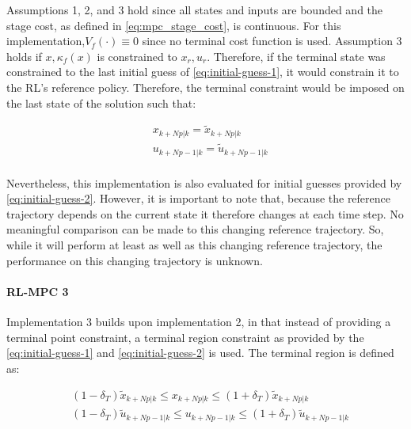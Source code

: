 Assumptions 1, 2, and 3 hold since all states and inputs are bounded and the stage cost, as defined in \autoref{eq:mpc_stage_cost}, is continuous. For this implementation,$V_f(\cdot) \equiv 0$ since no terminal cost function is used. Assumption 3 holds if $x,\kappa_f(x)$ is constrained to $x_r,u_r$. Therefore, if the terminal state was constrained to the last initial guess of \autoref{eq:initial-guess-1}, it would constrain it to the RL’s reference policy. Therefore, the terminal constraint would be imposed on the last state of the solution such that:

\begin{equation}\label{eq:terminal-constraint-ocp}
\begin{aligned}
	&x_{k+Np|k} = \tilde{x}_{k+Np|k}\\ 
	&u_{k+Np-1|k} = \tilde{u}_{k+Np-1|k}\\
\end{aligned}
\end{equation}

Nevertheless, this implementation is also evaluated for initial guesses provided by \autoref{eq:initial-guess-2}. However, it is important to note that, because the reference trajectory depends on the current state it therefore changes at each time step. No meaningful comparison can be made to this changing reference trajectory. So, while it will perform at least as well as this changing reference trajectory, the performance on this changing trajectory is unknown.

\paragraph{RL-MPC 3}
Implementation 3 builds upon implementation 2, in that instead of providing a terminal point constraint, a terminal region constraint as provided by the \autoref{eq:initial-guess-1} and \autoref{eq:initial-guess-2} is used. The terminal region is defined as:

\begin{equation}\label{eq:terminal-region}
	\begin{aligned}
		& (1-\delta_T)\tilde{x}_{k+Np|k} \leq x_{k+Np|k} \leq (1+\delta_T)\tilde{x}_{k+Np|k}\\
		&(1-\delta_T)\tilde{u}_{k+Np-1|k} \leq u_{k+Np-1|k} \leq (1+\delta_T) \tilde{u}_{k+Np-1|k}\\
	\end{aligned}
\end{equation}

